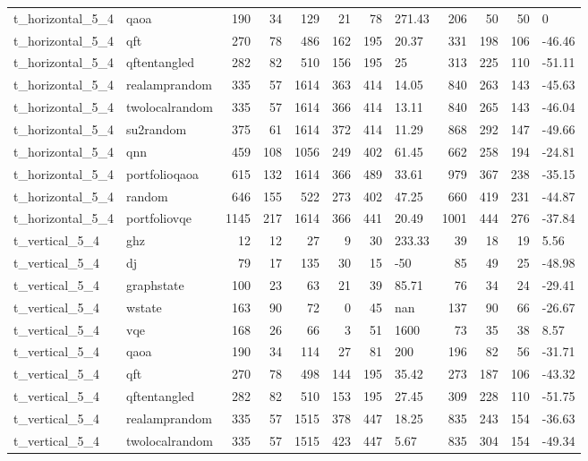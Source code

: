 \begin{longtable}{llrrrrrlrrrl}
t\_horizontal\_5\_4 & qaoa & 190 & 34 & 129 & 21 & 78 & 271.43 & 206 & 50 & 50 & 0 \\
t\_horizontal\_5\_4 & qft & 270 & 78 & 486 & 162 & 195 & 20.37 & 331 & 198 & 106 & -46.46 \\
t\_horizontal\_5\_4 & qftentangled & 282 & 82 & 510 & 156 & 195 & 25 & 313 & 225 & 110 & -51.11 \\
t\_horizontal\_5\_4 & realamprandom & 335 & 57 & 1614 & 363 & 414 & 14.05 & 840 & 263 & 143 & -45.63 \\
t\_horizontal\_5\_4 & twolocalrandom & 335 & 57 & 1614 & 366 & 414 & 13.11 & 840 & 265 & 143 & -46.04 \\
t\_horizontal\_5\_4 & su2random & 375 & 61 & 1614 & 372 & 414 & 11.29 & 868 & 292 & 147 & -49.66 \\
t\_horizontal\_5\_4 & qnn & 459 & 108 & 1056 & 249 & 402 & 61.45 & 662 & 258 & 194 & -24.81 \\
t\_horizontal\_5\_4 & portfolioqaoa & 615 & 132 & 1614 & 366 & 489 & 33.61 & 979 & 367 & 238 & -35.15 \\
t\_horizontal\_5\_4 & random & 646 & 155 & 522 & 273 & 402 & 47.25 & 660 & 419 & 231 & -44.87 \\
t\_horizontal\_5\_4 & portfoliovqe & 1145 & 217 & 1614 & 366 & 441 & 20.49 & 1001 & 444 & 276 & -37.84 \\
t\_vertical\_5\_4 & ghz & 12 & 12 & 27 & 9 & 30 & 233.33 & 39 & 18 & 19 & 5.56 \\
t\_vertical\_5\_4 & dj & 79 & 17 & 135 & 30 & 15 & -50 & 85 & 49 & 25 & -48.98 \\
t\_vertical\_5\_4 & graphstate & 100 & 23 & 63 & 21 & 39 & 85.71 & 76 & 34 & 24 & -29.41 \\
t\_vertical\_5\_4 & wstate & 163 & 90 & 72 & 0 & 45 & nan & 137 & 90 & 66 & -26.67 \\
t\_vertical\_5\_4 & vqe & 168 & 26 & 66 & 3 & 51 & 1600 & 73 & 35 & 38 & 8.57 \\
t\_vertical\_5\_4 & qaoa & 190 & 34 & 114 & 27 & 81 & 200 & 196 & 82 & 56 & -31.71 \\
t\_vertical\_5\_4 & qft & 270 & 78 & 498 & 144 & 195 & 35.42 & 273 & 187 & 106 & -43.32 \\
t\_vertical\_5\_4 & qftentangled & 282 & 82 & 510 & 153 & 195 & 27.45 & 309 & 228 & 110 & -51.75 \\
t\_vertical\_5\_4 & realamprandom & 335 & 57 & 1515 & 378 & 447 & 18.25 & 835 & 243 & 154 & -36.63 \\
t\_vertical\_5\_4 & twolocalrandom & 335 & 57 & 1515 & 423 & 447 & 5.67 & 835 & 304 & 154 & -49.34 \\

\end{longtable}
